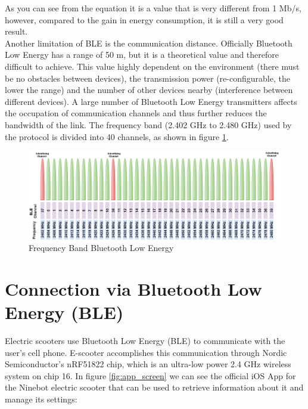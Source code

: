 \documentclass[binding=0.6cm,LaM,noexaminfo]{sapthesis}
\begin{document}
\noindent As you can see from the equation it is a value that is very different from 1 Mb/s, however, compared to the gain in energy consumption, it is still a very good result.\\

\noindent Another limitation of BLE is the communication distance. Officially Bluetooth Low Energy has a range of 50 m, but it is a theoretical value and therefore difficult to achieve. This value highly dependent on the environment (there must be no obstacles between devices), the transmission power (re-configurable, the lower the range) and the number of other devices nearby (interference between different devices). A large number of Bluetooth Low Energy transmitters affects the occupation of communication channels and thus further reduces the bandwidth of the link. The frequency band (2.402 GHz to 2.480 GHz) used by the protocol is divided into 40 channels, as shown in figure \ref{fig:freq_band_ble}.

\begin{figure}[!htp]
    \centering
    \includegraphics[width = .8\textwidth]{images/xxBLEChannels.png}
    \caption{Frequency Band Bluetooth Low Energy}
    \label{fig:freq_band_ble}
\end{figure}


\newpage
\section{Connection via Bluetooth Low Energy (BLE)}
Electric scooters use Bluetooth Low Energy (BLE) to communicate with the user's cell phone. E-scooter accomplishes this communication through Nordic Semiconductor's nRF51822 chip, which is an ultra-low power 2.4 GHz wireless system on chip 16. In figure \ref{fig:app_screen} we can see the official iOS App for the Ninebot electric scooter that can be used to retrieve information about it and manage its settings:
\end{document}
